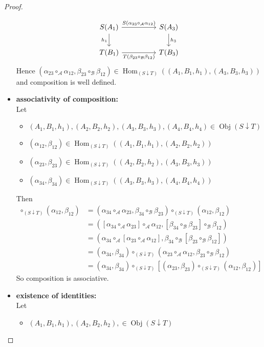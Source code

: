 \documentclass{book}
\theoremstyle{definition}
\newcommand{\al}{\alpha}
\newcommand{\be}{\beta}
\newcommand{\MA}{\mathcal{A}}
\newcommand{\MB}{\mathcal{B}}
\DeclareMathOperator{\Obj}{Obj}
\DeclareMathOperator{\Hom}{Hom}
\DeclareMathOperator*{\0}{\mbf{0}}
\DeclareMathOperator*{\1}{\mbf{1}}
\begin{document}
\begin{proof}
\begin{itemize}
\[\begin{tikzcd}
				S(A_1) \arrow[rr, "S(\al_{23} \circ_{\MA} \al_{12})"] \arrow[d, "h_1"']&  & S(A_3)  \arrow[d, "h_3"] \\
				T(B_1) \arrow[rr, "T(\be_{23} \circ_{\MB} \be_{12})"']                       &  & T(B_3)
			\end{tikzcd}
			\]
			Hence $(\al_{23} \circ_{\MA} \al_{12}, \be_{23} \circ_{\MB} \be_{12}) \in \Hom_{(S \downarrow T)}((A_1, B_1, h_1), (A_3, B_3, h_3))$ and composition is well defined. \\
			\item \textbf{associativity of composition:} \\
			Let 
			\begin{itemize}
				\item $(A_1, B_1, h_1), (A_2, B_2, h_2), (A_3, B_3, h_3), (A_4, B_4, h_4) \in \Obj(S \downarrow T)$
				\item $(\al_{12}, \be_{12}) \in \Hom_{(S \downarrow T)}((A_1, B_1, h_1), (A_2, B_2, h_2))$ 
				\item $(\al_{23}, \be_{23}) \in \Hom_{(S \downarrow T)}((A_2, B_2, h_2), (A_3, B_3, h_3))$
				\item $(\al_{34}, \be_{34}) \in \Hom_{(S \downarrow T)}((A_3, B_3, h_3), (A_4, B_4, h_4))$
			\end{itemize}
			Then 
			\begin{align*}
				[ (\al_{34}, \be_{34}) \circ_{(S \downarrow T)} (\al_{23}, \be_{23}) ] \circ_{(S \downarrow T)} (\al_{12}, \be_{12})
				& = (\al_{34} \circ_{\MA} \al_{23}, \be_{34} \circ_{\MB} \be_{23}) \circ_{(S \downarrow T)} (\al_{12}, \be_{12}) \\
				& = ([\al_{34} \circ_{\MA} \al_{23}] \circ_{\MA} \al_{12}, [\be_{34} \circ_{\MB} \be_{23}] \circ_{\MB} \be_{12}) \\
				& =  (\al_{34} \circ_{\MA} [\al_{23} \circ_{\MA} \al_{12}], \be_{34} \circ_{\MB} [\be_{23} \circ_{\MB} \be_{12}]) \\
				& = (\al_{34}, \be_{34}) \circ_{(S \downarrow T)} (\al_{23} \circ_{\MA} \al_{12}, \be_{23} \circ_{\MB} \be_{12}) \\
				& = (\al_{34}, \be_{34}) \circ_{(S \downarrow T)} [(\al_{23}, \be_{23}) \circ_{(S \downarrow T)} (\al_{12}, \be_{12})]
			\end{align*}
			So composition is associative. \\
			\item \textbf{existence of identities:} \\
			Let
			\begin{itemize}
				\item $(A_1, B_1, h_1), (A_2, B_2, h_2), \in \Obj(S \downarrow T)$

\end{itemize}
\end{itemize}
\end{proof}
\end{document}
